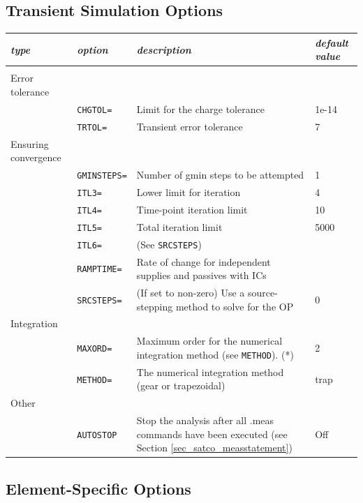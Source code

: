 \subsection{Transient Simulation Options}
\label{subsec_satco_tranoptions}

\begin{tabular}{p{2cm}|lp{8cm}p{1.5cm}}
\textit{type} &\textit{option} & \textit{description} & \textit{default value}\\ \hline \\ \vspace{-0.8\parskip}
{{\footnotesize Error tolerance}} & & & \\
&\texttt{CHGTOL=} & Limit for the charge tolerance & 1e-14 \\
&\texttt{TRTOL=} & Transient error tolerance & 7  \\
{{\footnotesize Ensuring convergence}} & & & \\
&\texttt{GMINSTEPS=} & Number of gmin steps to be attempted & 1 \\
&\texttt{ITL3=} & Lower limit for iteration & 4  \\
&\texttt{ITL4=} & Time-point iteration limit & 10  \\
&\texttt{ITL5=} & Total iteration limit & 5000  \\
&\texttt{ITL6=} & (See \texttt{SRCSTEPS}) &   \\
&\texttt{RAMPTIME=} & Rate of change for independent supplies and passives with ICs &   \\
&\texttt{SRCSTEPS=} & (If set to non-zero) Use a source-stepping method to solve for the OP & 0  \\
{\footnotesize Integration} & & & \\
&\texttt{MAXORD=} & Maximum order for the {numerical integration method (see \texttt{METHOD}).} (*) & 2  \\
&\texttt{METHOD=} & The numerical integration method (gear or trapezoidal) & trap  \\
{\footnotesize Other} & & & \\
&\texttt{AUTOSTOP} & Stop the analysis after all .meas commands have been executed (see Section \ref{sec_satco_measstatement}) & Off 
\end{tabular}

\subsection{Element-Specific Options}
\label{subsec_satco_specoptions}

